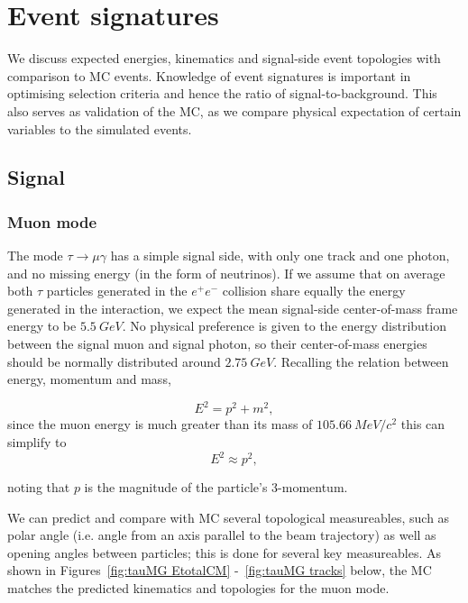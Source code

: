 \documentclass[12pt]{thesis}  %
\begin{document}

\chapter{Event signatures}
\label{chp:event signatures}

We discuss expected energies, kinematics and signal-side event topologies with comparison to MC events. Knowledge of event signatures is important in optimising selection criteria and hence the ratio of signal-to-background. This also serves as validation of the MC, as we compare physical expectation of certain variables to the simulated events.

\section{Signal}

\subsection{Muon mode}

The mode $\tau\to\mu\gamma$ has a simple signal side, with only one track and one photon, and no missing energy (in the form of neutrinos). If we assume that on average both $\tau$ particles generated in the $e^+ e^-$ collision share equally the energy generated in the interaction, we expect the mean signal-side center-of-mass frame energy to be $\SI{5.5}{GeV}$. No physical preference is given to the energy distribution between the signal muon and signal photon, so their center-of-mass energies should be normally distributed around $\SI{2.75}{GeV}$. Recalling the relation between energy, momentum and mass,

\begin{equation}
E^2 = p^2 + m^2,
\end{equation}
since the muon energy is much greater than its mass of $\SI{105.66}{MeV/c^2}$ this can simplify to
\begin{equation}
E^2 \approx p^2,
\end{equation}

noting that $p$ is the magnitude of the particle's 3-momentum.

We can predict and compare with MC several topological measureables, such as polar angle (i.e. angle from an axis parallel to the beam trajectory) as well as opening angles between particles; this is done for several key measureables. As shown in Figures~\ref{fig:tauMG EtotalCM} -~\ref{fig:tauMG tracks} below, the MC matches the predicted kinematics and topologies for the muon mode.
\end{document}
